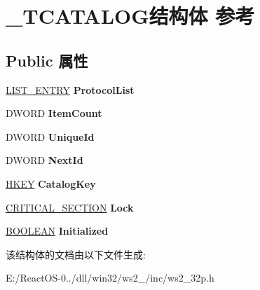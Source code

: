 \hypertarget{struct___t_c_a_t_a_l_o_g}{}\section{\+\_\+\+T\+C\+A\+T\+A\+L\+O\+G结构体 参考}
\label{struct___t_c_a_t_a_l_o_g}
\subsection*{Public 属性}
\begin{DoxyCompactItemize}
\item 
\mbox{\label{struct___t_c_a_t_a_l_o_g_ab1339b92ac05ab4d24c95de607f5e8e3}} 
\hyperlink{struct___l_i_s_t___e_n_t_r_y}{L\+I\+S\+T\+\_\+\+E\+N\+T\+RY} {\bfseries Protocol\+List}
\item 
\mbox{\label{struct___t_c_a_t_a_l_o_g_a9d623b69a080d42469127677025aeca8}} 
D\+W\+O\+RD {\bfseries Item\+Count}
\item 
\mbox{\label{struct___t_c_a_t_a_l_o_g_a96d0791d639112a9e105667da044c9e0}} 
D\+W\+O\+RD {\bfseries Unique\+Id}
\item 
\mbox{\label{struct___t_c_a_t_a_l_o_g_a51b85faaf947826a766749db7b4d0b39}} 
D\+W\+O\+RD {\bfseries Next\+Id}
\item 
\mbox{\label{struct___t_c_a_t_a_l_o_g_a102e02d64ca9a07043a096fa35856c5d}} 
\hyperlink{interfacevoid}{H\+K\+EY} {\bfseries Catalog\+Key}
\item 
\mbox{\label{struct___t_c_a_t_a_l_o_g_ad296e05cca431a5754c5c9ba6aa3a7f1}} 
\hyperlink{struct___c_r_i_t_i_c_a_l___s_e_c_t_i_o_n}{C\+R\+I\+T\+I\+C\+A\+L\+\_\+\+S\+E\+C\+T\+I\+ON} {\bfseries Lock}
\item 
\mbox{\label{struct___t_c_a_t_a_l_o_g_a64da1c283e00be140d83af906503c224}} 
\hyperlink{_processor_bind_8h_a112e3146cb38b6ee95e64d85842e380a}{B\+O\+O\+L\+E\+AN} {\bfseries Initialized}
\end{DoxyCompactItemize}


该结构体的文档由以下文件生成\+:\begin{DoxyCompactItemize}
\item 
E\+:/\+React\+O\+S-\/0../dll/win32/ws2\+\_/inc/ws2\+\_\+32p.\+h\end{DoxyCompactItemize}
